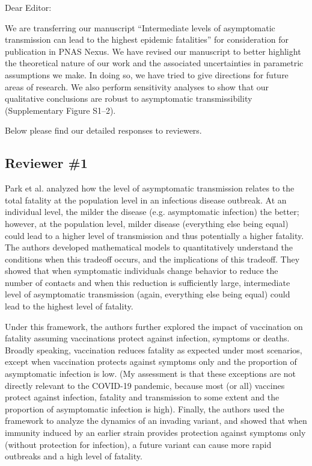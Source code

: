 \documentclass[12pt]{article}
\newcommand{\rev}{\subsection*}
\newcommand{\revtext}{\textsf}
\begin{document}
\noindent Dear Editor:

We are transferring our manuscript ``Intermediate levels of asymptomatic transmission can lead to the highest epidemic fatalities'' for consideration for publication in PNAS Nexus.
We have revised our manuscript to better highlight the theoretical nature of our work and the associated uncertainties in parametric assumptions we make.
In doing so, we have tried to give directions for future areas of research.
We also perform sensitivity analyses to show that our qualitative conclusions are robust to asymptomatic transmissibility (Supplementary Figure S1--2).

Below please find our detailed responses to reviewers.

\rev{Reviewer \#1}

\revtext{Park et al. analyzed how the level of asymptomatic transmission relates to the total fatality at the population level in an infectious disease outbreak. At an individual level, the milder the disease (e.g. asymptomatic infection) the better; however, at the population level, milder disease (everything else being equal) could lead to a higher level of transmission and thus potentially a higher fatality. The authors developed mathematical models to quantitatively understand the conditions when this tradeoff occurs, and the implications of this tradeoff. They showed that when symptomatic individuals change behavior to reduce the number of contacts and when this reduction is sufficiently large, intermediate level of asymptomatic transmission (again, everything else being equal) could lead to the highest level of fatality.}

\revtext{Under this framework, the authors further explored the impact of vaccination on fatality assuming vaccinations protect against infection, symptoms or deaths. Broadly speaking, vaccination reduces fatality as expected under most scenarios, except when vaccination protects against symptoms only and the proportion of asymptomatic infection is low. (My assessment is that these exceptions are not directly relevant to the COVID-19 pandemic, because most (or all) vaccines protect against infection, fatality and transmission to some extent and the proportion of asymptomatic infection is high). Finally, the authors used the framework to analyze the dynamics of an invading variant, and showed that when immunity induced by an earlier strain provides protection against symptoms only (without protection for infection), a future variant can cause more rapid outbreaks and a high level of fatality.}
\end{document}

